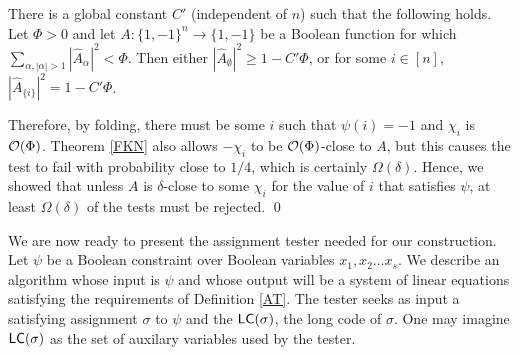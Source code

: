 \begin{theorem}\label{FKN}
  There is a global constant $C'$ (independent of $n$) such that the
  following holds. Let $\Phi > 0$ and let $A : \{1, -1\}^n \rightarrow
  \{1, -1\}$ be a Boolean function for which $\sum_{\alpha, |\alpha|
    >1} |\hat{A}_\alpha|^2 < \Phi$. Then either $|\hat{A}_\emptyset|^2
  \ge 1 - C'\Phi$, or for some $i \in [n]$, $|\hat{A}_{\{i\}}|^2 = 1 -
  C'\Phi$.
\end{theorem}


\noindent Therefore, by folding, there must be some $i$ such that $\psi(i) = -1$
and $\chi_{i}$ is ${\cal O}(\Phi)$. Theorem \ref{FKN} also allows $-
\chi_i$ to be ${\cal O}(\Phi)$-close to $A$, but this causes the test
to fail with probability close to $1/4$, which is certainly
$\Omega(\delta)$. Hence, we showed that unless $A$ is $\delta$-close
to some $\chi_{i}$ for the value of $i$ that satisfies $\psi$, at
least $\Omega(\delta)$ of the tests must be
rejected. \qed \\







  
 
\noindent We are now ready to present the assignment tester needed for
our construction. Let $\psi$ be a Boolean constraint over Boolean
variables $x_1, x_2 \ldots x_s$. We describe an algorithm whose input
is $\psi$ and whose output will be a system of linear equations
satisfying the requirements of Definition \ref{AT}. The tester seeks
as input a satisfying assignment $\sigma$ to $\psi$ and the
${\sf LC}(\sigma)$, the long code of $\sigma$. One may imagine ${\sf LC}(\sigma)$
as the set of auxilary variables used by the tester. \\

